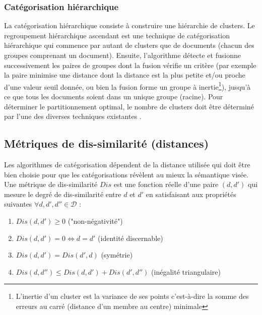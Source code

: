 
\subsubsection{Catégorisation hiérarchique}
La catégorisation hiérarchique consiste à construire une hiérarchie de clusters. Le regroupement hiérarchique ascendant est une technique de catégorisation hiérarchique qui commence par autant de clusters que de documents (chacun des groupes comprenant un document). Ensuite, l'algorithme détecte et fusionne successivement les paires de groupes dont la fusion vérifie un critère (par exemple la paire minimise une distance dont la distance est la plus petite et/ou proche d'une valeur seuil donnée, ou bien la fusion forme un groupe à inertie\footnote{L'inertie d'un cluster est la variance de ses points c'est-à-dire la somme des erreurs au carré (distance d'un membre au centre) minimale}),
jusqu'à ce que tous les documents soient dans un unique groupe (racine). Pour déterminer le partitionnement optimal, le nombre de clusters doit être déterminé par l'une des diverses techniques existantes \citep{thorndike1953HAC_nb_clusters, salvador2004Hierarchical_clustering_number_of_clusters}.

\subsection{Métriques de dis-similarité (distances)}
\label{sec:similarite:distances}
Les algorithmes de catégorisation dépendent de la distance utilisée qui doit être bien choisie pour que les catégorisations révèlent au mieux la sémantique visée.
 Une métrique de dis-similarité $Dis$ est une fonction réelle d'une paire $(d,d')$ qui mesure le degré de dis-similarité entre $d$ et $d'$  en satisfaisant aux propriétés suivantes $\forall d,d',d'' \in \mathcal{D}$ \citep{wang2015distancemetriclearningsurvey}:
\begin{enumerate}
\item $Dis(d,d') \geq 0$ ("non-négativité")
\item $Dis(d,d') = 0  \Leftrightarrow d = d'$ (identité discernable)
\item $Dis(d,d') = Dis(d', d)$ (symétrie)
\item $Dis(d,d'') \leq Dis(d,d') + Dis(d',d'')$ (inégalité triangulaire) \label{enum:sim:ineq-tri}
\end{enumerate}


